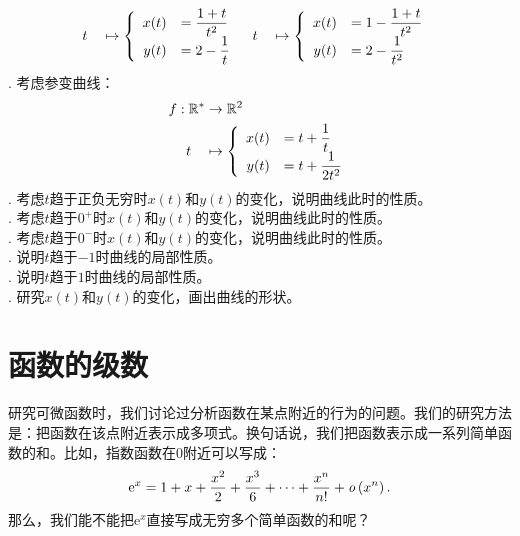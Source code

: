 \documentclass[12pt,UTF8,fontset=none]{ctexbook}
\begin{document}
\begin{xt}
\begin{align*}
        \;\;t\quad &\mapsto\left\{
            \begin{array}[]{rl}
                x(t) &\displaystyle = \frac{1+t}{t^2} \\
                y(t) &\displaystyle = 2 - \frac{1}{t} \\
            \end{array}
        \right.
        & 
        t\quad &\mapsto\left\{
            \begin{array}[]{rl}
                x(t) &\displaystyle = 1 - \frac{1+t}{t^2} \\
                y(t) &\displaystyle = 2 - \frac{1}{t^2} \\
            \end{array}
        \right.
    \end{align*}
    . 考虑参变曲线：
    \begin{align*}
        f: \mathbb{R}^* &\rightarrow \mathbb{R}^2 \\
        t\quad &\mapsto\left\{
            \begin{array}[]{rl}
                x(t) &\displaystyle = t + \frac{1}{t} \\
                y(t) &\displaystyle = t + \frac{1}{2t^2} \\
            \end{array}
        \right.
    \end{align*}
    . 考虑$t$趋于正负无穷时$x(t)$和$y(t)$的变化，说明曲线此时的性质。\\
    . 考虑$t$趋于$0^+$时$x(t)$和$y(t)$的变化，说明曲线此时的性质。\\
    . 考虑$t$趋于$0^-$时$x(t)$和$y(t)$的变化，说明曲线此时的性质。\\
    . 说明$t$趋于$-1$时曲线的局部性质。\\
    . 说明$t$趋于$1$时曲线的局部性质。\\
    . 研究$x(t)$和$y(t)$的变化，画出曲线的形状。
\end{xt}

\chapter{函数的级数}

研究可微函数时，我们讨论过分析函数在某点附近的行为的问题。我们的研究方法是：把函数在该点附近表示成多项式。换句话说，我们把函数表示成一系列简单函数的和。比如，指数函数在$0$附近可以写成：
$$\mathrm{e}^x = 1 + x + \frac{x^2}{2} + \frac{x^3}{6} + \cdots + \frac{x^n}{n!} + \mathit{o}\left(x^n\right).$$
那么，我们能不能把$\mathrm{e}^x$直接写成无穷多个简单函数的和呢？
\end{document}
